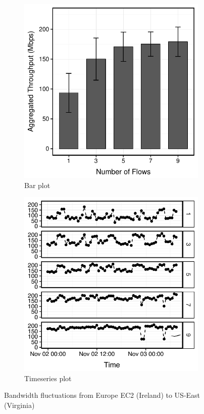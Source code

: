 \begin{figure}
  \centering
  \begin{subfigure}{.48\columnwidth}
    \centering
    \includegraphics[width=.95\linewidth]{figures/bw-bar.pdf}
    \caption{Bar plot}
    \label{fig:bar}
  \end{subfigure}
  \begin{subfigure}{.48\columnwidth}
    \centering
    \includegraphics[width=.95\linewidth]{figures/bw-ts.pdf}
    \caption{Timeseries plot}
    \label{fig:ts}
  \end{subfigure}
  \caption{Bandwidth fluctuations from Europe EC2 (Ireland) to US-East
    (Virginia)}
  \label{fig:bw}
\end{figure}

